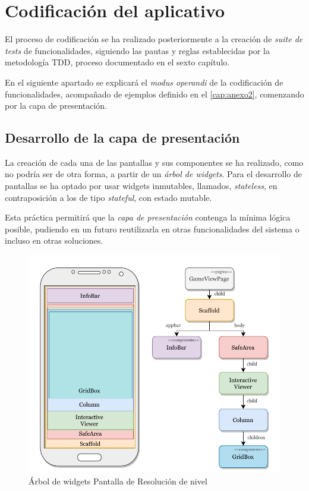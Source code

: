\section{Codificación del aplicativo}
El proceso de codificación se ha realizado posteriormente a la creación de \textit{suite de tests} de funcionalidades, siguiendo las pautas y
reglas establecidas por la metodología TDD, proceso documentado en el sexto capítulo.

En el siguiente apartado se explicará el \textit{modus operandi} de la codificación de funcionalidades, acompañado de ejemplos definido 
en el \autoref{cap:anexo2}, comenzando por la capa de presentación.

\subsection{Desarrollo de la capa de presentación}
La creación de cada una de las pantallas y sus componentes se ha realizado, como no podría ser de otra forma, a partir de un \textit{árbol de widgets}. 
Para el desarrollo de pantallas se ha optado por usar widgets inmutables, llamados, \textit{stateless}, en contraposición a los de tipo \textit{stateful},
con estado mutable. \cite{10.1007/978-981-15-1465-4_56} 

Esta práctica permitirá que la \textit{capa de presentación} contenga la mínima lógica posible, pudiendo en un futuro reutilizarla
en otras funcionalidades del sistema o incluso en otras soluciones.

\begin{figure}[H]
  \centering
  \includegraphics[scale=0.83]{images/treewidgets.pdf}
  \caption{Árbol de widgets Pantalla de Resolución de nivel}
  \label{fig:tree-widgets-1}
\end{figure}

